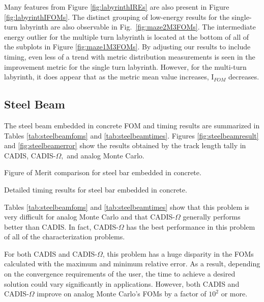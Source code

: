 Many features from Figure \ref{fig:labyrinthIREs} are also present in Figure
\ref{fig:labyrinthIFOMs}. The distinct grouping of low-energy results for the
single-turn labyrinth are also observable in Fig.~\ref{fig:maze2M3FOMs}. The intermediate
energy outlier for the multiple turn labyrinth is located at the bottom of
all of the subplots in Figure \ref{fig:maze1M3FOMs}. By adjusting our results to
include timing, even less of a trend with metric distribution measurements is
seen in the improvement metric for the single turn labyrinth. However, for the
multi-turn labyrinth, it does appear that as the metric mean value increases,
I$_{FOM}$ decreases.

\subsection{Steel Beam}
\label{subsec:resultbeam}

The steel beam embedded in concrete FOM and timing
results are summarized in Tables
\ref{tab:steelbeamfoms} and \ref{tab:steelbeamtimes}. Figures
\ref{fig:steelbeamresult} and \ref{fig:steelbeamerror} show the results obtained
by the track length tally in CADIS, CADIS-$\Omega,$ and analog
Monte Carlo.

\begin{table}[h!]
  \centering
  
  \caption[Figure of Merit comparison for steel bar embedded in concrete.]
  {Figure of Merit comparison for steel bar embedded in concrete. }
  \label{tab:steelbeamfoms}
\end{table}

\begin{table}[h!]
  \centering
  
  \caption[Detailed timing results for steel bar embedded in concrete.]
  {Detailed timing results for steel bar embedded in concrete.}
  \label{tab:steelbeamtimes}
\end{table}

Tables \ref{tab:steelbeamfoms} and
\ref{tab:steelbeamtimes} show that this problem is very difficult for
analog Monte Carlo and that CADIS-$\Omega$ generally performs better than CADIS.
In fact, CADIS-$\Omega$ has the best performance
in this problem of all of the characterization problems.

For both CADIS and CADIS-$\Omega$, this problem has a huge disparity in the FOMs
calculated with the maximum and minimum relative error. As a result, depending
on the convergence requirements of the user, the time to achieve
a desired solution could vary significantly in applications. However, both CADIS
and CADIS-$\Omega$ improve on analog Monte Carlo's FOMs by a factor
of $10^{2}$ or more.

